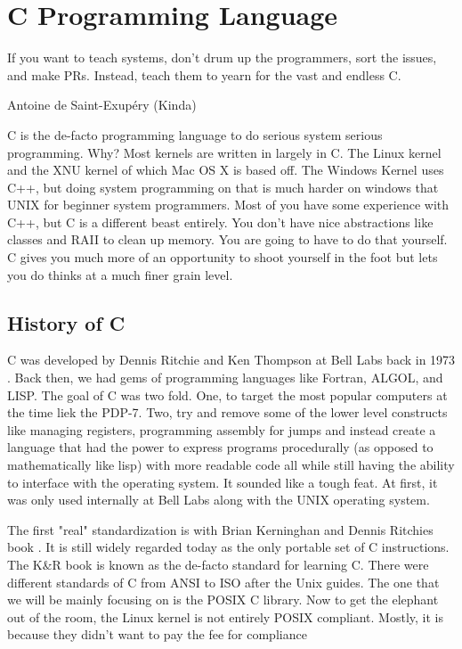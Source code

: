 \chapter{C Programming Language}

\epigraph{If you want to teach systems, don't drum up the programmers, sort the issues, and make PRs. Instead, teach them to yearn for the vast and endless C.}{Antoine de Saint-Exup\'{e}ry (Kinda)}

C is the de-facto programming language to do serious system serious programming. Why? Most kernels are written in largely in C. The Linux kernel \cite{Love} and the XNU kernel \citet{xnukernel} of which Mac OS X is based off. The Windows Kernel uses C++, but doing system programming on that is much harder on windows that UNIX for beginner system programmers. Most of you have some experience with C++, but C is a different beast entirely. You don't have nice abstractions like classes and RAII to clean up memory. You are going to have to do that yourself. C gives you much more of an opportunity to shoot yourself in the foot but lets you do thinks at a much finer grain level.

\section{History of C}

C was developed by Dennis Ritchie and Ken Thompson at Bell Labs back in 1973 \cite{Ritchie:1993:DCL:155360.155580}. Back then, we had gems of programming languages like Fortran, ALGOL, and LISP. The goal of C was two fold. One, to target the most popular computers at the time liek the PDP-7. Two, try and remove some of the lower level constructs like managing registers, programming assembly for jumps and instead create a language that had the power to express programs procedurally (as opposed to mathematically like lisp) with more readable code all while still having the ability to interface with the operating system. It sounded like a tough feat. At first, it was only used internally at Bell Labs along with the UNIX operating system. 

The first "real" standardization is with Brian Kerninghan and Dennis Ritchies book \cite{kernighan1988c}. It is still widely regarded today as the only \gls{portable} set of C instructions. The K\&R book is known as the de-facto standard for learning C.  There were different standards of C from ANSI to ISO after the Unix guides. The one that we will be mainly focusing on is the \gls{POSIX} C library. Now to get the elephant out of the room, the Linux kernel is not entirely POSIX compliant. Mostly, it is because they didn't want to pay the fee for compliance

